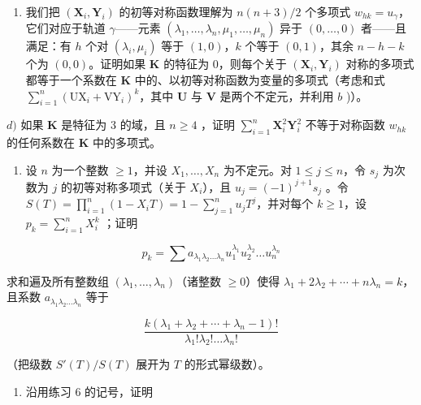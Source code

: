\begin{enumerate}
\def\labelenumi{\alph{enumi})}
\setcounter{enumi}{2}
\tightlist
\item
  我们把 \((\mathbf{X}_i, \mathbf{Y}_i)\) 的初等对称函数理解为 \(n(n + 3)/2\) 个多项式 \(w_{hk} = u_\gamma\)，它们对应于轨道 \(\gamma\)——元素 \((\lambda_1, \ldots, \lambda_n, \mu_1, \ldots, \mu_n)\) 异于 \((0, \ldots, 0)\) 者——且满足：有 \(h\) 个对 \((\lambda_i, \mu_i)\) 等于 \((1, 0)\)，\(k\) 个等于 \((0, 1)\)，其余 \(n - h - k\) 个为 \((0, 0)\)。证明如果 \(\mathbf{K}\) 的特征为 0，则每个关于 \((\mathbf{X}_i, \mathbf{Y}_i)\) 对称的多项式都等于一个系数在 \(\mathbf{K}\) 中的、以初等对称函数为变量的多项式（考虑和式 \(\sum_{i=1}^{n} (\mathrm{UX}_i + \mathrm{VY}_i)^k\)，其中 \(\mathbf{U}\) 与 \(\mathbf{V}\) 是两个不定元，并利用 \(b\) )）。
\end{enumerate}

\(d)\) 如果 \(\mathbf{K}\) 是特征为 3 的域，且 \(n \geqslant 4\) ，证明 \(\sum_{i=1}^{n} \mathbf{X}_i^2 \mathbf{Y}_i^2\) 不等于对称函数 \(w_{hk}\) 的任何系数在 \(\mathbf{K}\) 中的多项式。

\begin{enumerate}
\def\labelenumi{\arabic{enumi})}
\setcounter{enumi}{5}
\tightlist
\item
  设 \(n\) 为一个整数 \(\geqslant 1\)，并设 \(X_1, \ldots, X_n\) 为不定元。对 \(1 \leqslant j \leqslant n\)，令 \(s_j\) 为次数为 \(j\) 的初等对称多项式（关于 \(X_i\)），且 \(u_j = (-1)^{j+1} s_j\) 。令 \(S(T) = \prod_{i=1}^{n} (1 - X_i T) = 1 - \sum_{j=1}^{n} u_j T^j\)，并对每个 \(k \geqslant 1\)，设 \(p_k = \sum_{i=1}^{n} X_i^k\) ；证明
\end{enumerate}

\[
p _ {k} = \sum a _ {\lambda_ {1} \lambda_ {2} \dots \lambda_ {n}} u _ {1} ^ {\lambda_ {1}} u _ {2} ^ {\lambda_ {2}} \dots u _ {n} ^ {\lambda_ {n}}
\]

求和遍及所有整数组 \((\lambda_{1},\ldots,\lambda_{n})\)（诸整数 \(\geqslant0\)）使得 \(\lambda_{1}+2\lambda_{2}+\cdots+n\lambda_{n}=k\)，且系数 \(a_{\lambda_{1}\lambda_{2}\ldots\lambda_{n}}\) 等于

\[
\frac {k \left(\lambda_ {1} + \lambda_ {2} + \cdots + \lambda_ {n} - 1\right) !}{\lambda_ {1} ! \lambda_ {2} ! \dots \lambda_ {n} !}
\]

（把级数 \(S'(T) / S(T)\) 展开为 \(T\) 的形式幂级数）。

\begin{enumerate}
\def\labelenumi{\arabic{enumi})}
\setcounter{enumi}{6}
\tightlist
\item
  沿用练习 6 的记号，证明
\end{enumerate}

